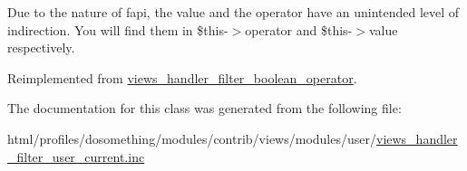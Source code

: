 Due to the nature of fapi, the value and the operator have an unintended level of indirection. You will find them in \$this-\/$>$operator and \$this-\/$>$value respectively. 

Reimplemented from \hyperlink{classviews__handler__filter__boolean__operator_ab3afc650701939c060e684d75fa2b21b}{views\_\-handler\_\-filter\_\-boolean\_\-operator}.

The documentation for this class was generated from the following file:\begin{DoxyCompactItemize}
\item 
html/profiles/dosomething/modules/contrib/views/modules/user/\hyperlink{views__handler__filter__user__current_8inc}{views\_\-handler\_\-filter\_\-user\_\-current.inc}\end{DoxyCompactItemize}
